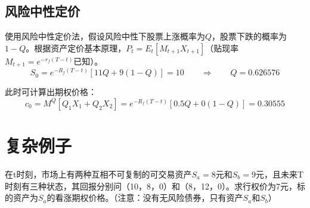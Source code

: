 \documentclass[11pt]{article}
\begin{document}
\subsection{风险中性定价}
使用风险中性定价法，假设风险中性下股票上涨概率为$Q$，股票下跌的概率为$1-Q$。根据资产定价基本原理，$P_t = E_t[M_{t+1}X_{t+1}]$（贴现率$M_{t+1}=e^{-r_f(T-t)}$已知）。
\begin{equation*}
 S_0 = e^{-R_f(T-t)}[11Q+9(1-Q)] = 10
 \qquad
 \Rightarrow
 \qquad
 Q = 0.626576
\end{equation*}

此时可计算出期权价格：
\begin{equation*}
 c_0 = M^Q[Q_1X_1 + Q_2X_2] = e^{-R_f(T-t)}[0.5Q+0(1-Q)] = 0.30555
\end{equation*}

\section{复杂例子}
在t时刻，市场上有两种互相不可复制的可交易资产$S_a=8$元和$S_b=9$元，且未来T时刻有三种状态，其回报分别问（10，8，0）和（8，12，0）。求行权价为7元，标的资产为$S_a$的看涨期权价格。（注意：没有无风险债券，只有资产$S_a$和$S_b$）
\end{document}

